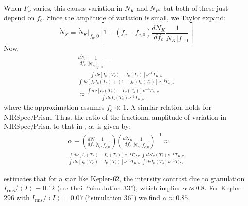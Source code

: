 When $F_\nu$ varies, this causes variation in $\dot{N}_K$ and
$\dot{N}_P$, but both of these just depend on $f_c$. Since the amplitude
of variation is small, we Taylor expand:
\begin{equation}
\dot { N } _ { K } = \dot { N } _ { K } | _ { f _ { 0} ,0} \left[ 1+ \left( f _ { c } - f _ { c ,0} \right) \frac { d \dot { N } _ { K } } { d f _ { c } } \frac { 1} { \dot { N } _ { K } | f _ { c ,0} } \right]
\end{equation}
Now,
\begin{multline}
\frac { d \dot { N } _ { K } } { d f _ { c } } \frac { 1} { \dot { N } _ { K } | _ { f _ { c } ,0} } =\\ \frac { \int d \nu \left[ I _ { \nu } \left( T _ { c } \right) - I _ { \nu } \left( T _ { s } \right) \right] \nu ^ { - 1} T _ { K ,\nu } } { \int d \nu \left[ f _ { c } I _ { \nu } \left( T _ { c } \right) + \left( 1- f _ { c } \right) I _ { \nu } \left( T _ { s } \right) \right] \nu ^ { - 1} T _ { K ,\nu } } \\
\approx \frac { \int d \nu  \left[ I _ { \nu } \left( T _ { c } \right) - I _ { \nu } \left( T _ { s } \right) \right]  \nu ^ { - 1} T _ { K ,\nu } } { \int d \nu I _ { \nu } \left( T _ { s } \right) \nu ^ { - 1} T_{K ,\nu} }
\end{multline}
where the approximation assumes $f_c \ll 1$. A similar relation holds for NIRSpec/Prism. Thus, the ratio of the fractional amplitude of
variation in NIRSpec/Prism to that in \kepler, $\alpha$, is given by:
\begin{multline}
\alpha \equiv \left( \frac { d \dot{N} } { d f _ { c } } \frac { 1} { \dot { N }_P | f _ { c ,0} } 
\right)  \left( \frac { d \dot{N} _ { K } } { d f _ { c } } \frac {1} { \dot{N} _ { K } | f _ { c ,0} } \right)^{-1} \approx\\
\frac { \int d \nu [I_\nu(T_c)-I_\nu(T_s)] \nu ^ { - 1} T _ { P ,\nu } } { \int d \nu [I_\nu(T_c)-I_\nu(T_s)] \nu ^ { - 1} T _ { K ,\nu } } \frac { \int d \nu I _ { \nu } \left( T _ { s } \right) \nu ^ { - 1} T _ { K ,\nu } } { \int d \nu I _ { \nu } \left( T _ { s } \right) \nu ^ { - 1} T_{P ,\nu}}
\end{multline}

\citet{Trampedach2013} estimates that for a star like Kepler-62, the intensity contrast due to granulation $ I_\mathrm{rms} / \left<I\right> = 0.12$ (see their ``simulation 33''), which implies $\alpha \approx 0.8$. For Kepler-296 with $I_\mathrm{rms}/\left<I\right> = 0.07$ (``simulation 36'') we find $\alpha \approx 0.85$.

